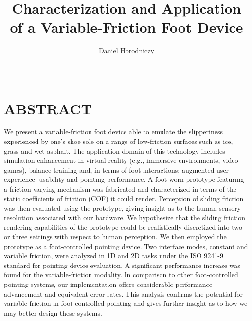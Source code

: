 \documentclass [12pt,letterpaper]{report}
\begin{document}

\title{%
Characterization and Application of a Variable-Friction Foot Device}
\author{Daniel Horodniczy}
\date{\Month\ \number\year}

\maketitle

\raggedbottom
\onehalfspacing
{}

\section*{\centering ABSTRACT}

We present a variable-friction foot device able to emulate the slipperiness experienced by one's shoe sole on a range of low-friction surfaces such as ice, grass and wet asphalt. The application domain of this technology includes simulation enhancement in virtual reality (e.g., immersive environments, video games), balance training and, in terms of foot interactions: augmented user experience, usability and pointing performance. A foot-worn prototype featuring a friction-varying mechanism was fabricated and characterized in terms of the static coefficients of friction (COF) it could render. Perception of sliding friction was then evaluated using the prototype, giving insight as to the human sensory resolution associated with our hardware. We hypothesize that the sliding friction rendering capabilities of the prototype could be realistically discretized into two or three settings with respect to human perception. We then employed the prototype as a foot-controlled pointing device. Two interface modes, constant and variable friction, were analyzed in 1D and 2D tasks under the ISO 9241-9 standard for pointing device evaluation. A significant performance increase was found for the variable-friction modality. In comparison to other foot-controlled pointing systems, our implementation offers considerable performance advancement and equivalent error rates. This analysis confirms the potential for variable friction in foot-controlled pointing and gives further insight as to how we may better design these systems.
\end{document}
